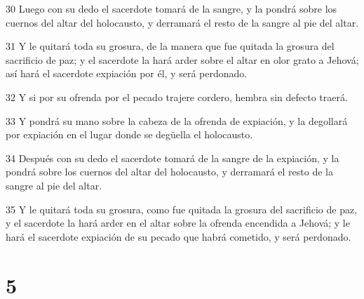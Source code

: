 \par 30 Luego con su dedo el sacerdote tomará de la sangre, y la pondrá sobre los cuernos del altar del holocausto, y derramará el resto de la sangre al pie del altar.
\par 31 Y le quitará toda su grosura, de la manera que fue quitada la grosura del sacrificio de paz; y el sacerdote la hará arder sobre el altar en olor grato a Jehová; así hará el sacerdote expiación por él, y será perdonado.
\par 32 Y si por su ofrenda por el pecado trajere cordero, hembra sin defecto traerá.
\par 33 Y pondrá su mano sobre la cabeza de la ofrenda de expiación, y la degollará por expiación en el lugar donde se degüella el holocausto.
\par 34 Después con su dedo el sacerdote tomará de la sangre de la expiación, y la pondrá sobre los cuernos del altar del holocausto, y derramará el resto de la sangre al pie del altar.
\par 35 Y le quitará toda su grosura, como fue quitada la grosura del sacrificio de paz, y el sacerdote la hará arder en el altar sobre la ofrenda encendida a Jehová; y le hará el sacerdote expiación de su pecado que habrá cometido, y será perdonado.

\chapter{5}


